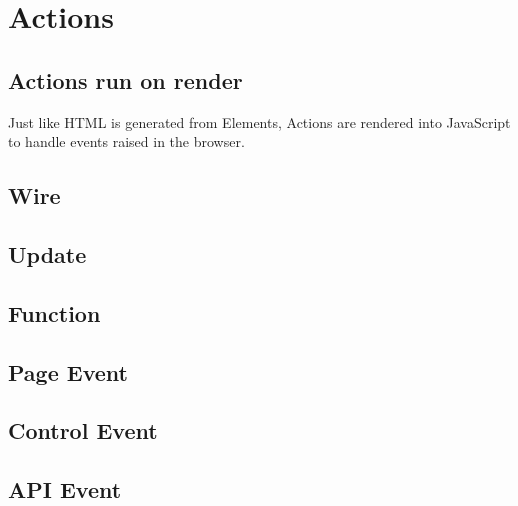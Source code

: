 \section{Actions}

\subsection{Actions run on render}
Just like HTML is generated from Elements, Actions are rendered into JavaScript to handle events raised in the browser.

\subsection{Wire}

\subsection{Update}

\subsection{Function}

\subsection{Page Event}

\subsection{Control Event}

\subsection{API Event}

